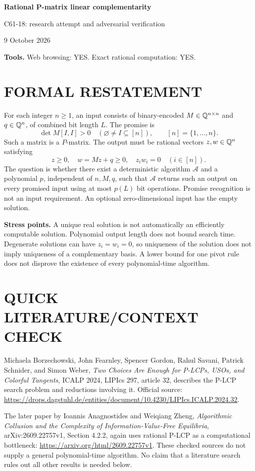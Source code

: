 \documentclass[11pt,a4paper]{article}
\theoremstyle{definition}\newtheorem{definition}[theorem]{Definition}
\theoremstyle{remark}\newtheorem{remark}[theorem]{Remark}
\newcommand{\1}{\mathbf 1}
\begin{document}
\begin{center}
{\Large\bfseries Rational P-matrix linear complementarity}\par
\medskip
{\large C61-18: research attempt and adversarial verification}\par
9 October 2026
\end{center}
\textbf{Tools.} Web browsing: YES. Exact rational computation: YES.\par
\section{FORMAL RESTATEMENT}
For each integer $n\ge1$, an input consists of binary-encoded $M\in\mathbb Q^{n\times n}$ and $q\in\mathbb Q^n$, of combined bit length $L$. The promise is
\[
 \det M[I,I]>0\quad(\varnothing\ne I\subseteq[n]),\qquad[n]=\{1,\ldots,n\}.
\]
Such a matrix is a $P$-matrix. The output must be rational vectors $z,w\in\mathbb Q^n$ satisfying
\[
 z\ge0,\quad w=Mz+q\ge0,\quad z_iw_i=0\quad(i\in[n]).
\]
The question is whether there exist a deterministic algorithm $\mathcal A$ and a polynomial $p$, independent of $n,M,q$, such that $\mathcal A$ returns such an output on every promised input using at most $p(L)$ bit operations. Promise recognition is not an input requirement. An optional zero-dimensional input has the empty solution.

\textbf{Stress points.} A unique real solution is not automatically an efficiently computable solution. Polynomial output length does not bound search time. Degenerate solutions can have $z_i=w_i=0$, so uniqueness of the solution does not imply uniqueness of a complementary basis. A lower bound for one pivot rule does not disprove the existence of every polynomial-time algorithm.

\section{QUICK LITERATURE/CONTEXT CHECK}
Michaela Borzechowski, John Fearnley, Spencer Gordon, Rahul Savani, Patrick Schnider, and Simon Weber, \emph{Two Choices Are Enough for P-LCPs, USOs, and Colorful Tangents}, ICALP 2024, LIPIcs 297, article 32, describes the P-LCP search problem and reductions involving it. Official source: \url{https://drops.dagstuhl.de/entities/document/10.4230/LIPIcs.ICALP.2024.32}.

The later paper by Ioannis Anagnostides and Weiqiang Zheng, \emph{Algorithmic Collusion and the Complexity of Information-Value-Free Equilibria}, arXiv:2609.22757v1, Section 4.2.2, again uses rational P-LCP as a computational bottleneck: \url{https://arxiv.org/html/2609.22757v1}. These checked sources do not supply a general polynomial-time algorithm. No claim that a literature search rules out all other results is needed below.
\end{document}
